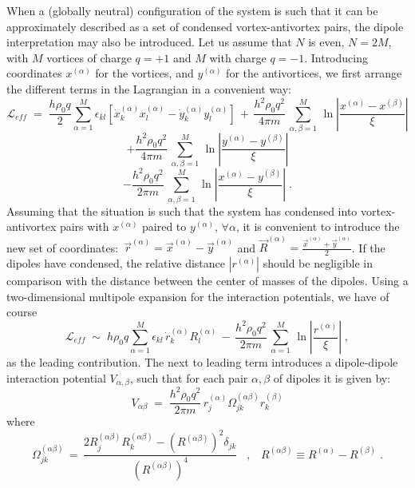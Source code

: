 \documentclass[a4paper,12pt]{article} \tolerance=200
\begin{document}
When a (globally neutral) configuration of the system is such that it
can be approximately described as a set of condensed vortex-antivortex
pairs, the dipole interpretation may also be introduced. Let us assume
that $N$ is even, $N= 2 M$, with $M$ vortices of charge $q=+1$ and $M$
with charge $q=-1$. Introducing coordinates $x^{(\alpha)}$ for the
vortices, and $y^{(\alpha)}$ for the antivortices, we first arrange the
different terms in the Lagrangian in a convenient way:
$$
{\mathcal L}_{eff}\;=\; \frac{h \rho_0 q}{2} \sum_{\alpha = 1}^M \epsilon_{kl} [\dot{x}^{(\alpha)}_k x^{(\alpha)}_l - \dot{y}^{(\alpha)}_k y^{(\alpha)}_l]
\,+\, 
\frac{h^2\rho_0 q^2}{4\pi m}\,\sum_{\alpha,\beta=1}^M \, \ln |\frac{x^{(\alpha)} - x^{(\beta)}}{\xi}| 
$$
$$
+ \frac{h^2\rho_0 q^2}{4\pi m}\,\sum_{\alpha,\beta=1}^M \, \ln |\frac{y^{(\alpha)} - y^{(\beta)}}{\xi}| 
$$
\begin{equation}\label{eq:fq4}
- \frac{h^2\rho_0 q^2}{2\pi m}\,\sum_{\alpha,\beta=1}^M \, \ln |\frac{x^{(\alpha)} - y^{(\beta)}}{\xi}| \;.
\end{equation}
Assuming that the situation is such that the system has condensed into
vortex-antivortex pairs with $x^{(\alpha)}$ paired to $y^{(\alpha)}$, $\forall \alpha$, it
is convenient to introduce the new set of coordinates:~\mbox{${\vec
    r}^{(\alpha)}={\vec x}^{(\alpha)} - {\vec y}^{(\alpha)}$} and {${\vec
    R}^{(\alpha)}=\frac{{\vec x}^{(\alpha)} + {\vec y}^{(\alpha)}}{2}$}. If the
dipoles have condensed, the relative distance $|r^{(\alpha)}|$ should be
negligible in comparison with the distance between the center of
masses of the dipoles. Using a two-dimensional multipole expansion
for the interaction potentials, we have of course
\begin{equation}\label{eq:fq5}
{\mathcal L}_{eff}\;\sim\; h \rho_0 q \sum_{\alpha = 1}^M \epsilon_{kl} \, \dot{r}^{(\alpha)}_k  R^{(\alpha)}_l 
\,-\, \frac{h^2\rho_0 q^2}{2 \pi m}\,\sum_{\alpha=1}^M \, \ln |\frac{r^{(\alpha)}}{\xi}|\;,
\end{equation}
as the leading contribution. The next to leading term introduces a
dipole-dipole interaction potential $V_{\alpha,\beta}$, such that for each pair
$\alpha,\beta$ of dipoles it is given by:
\begin{equation}
V_{\alpha\beta}\;=\; \frac{h^2\rho_0 q^2}{2 \pi m}\, r_j^{(\alpha)} \Omega^{(\alpha\beta)}_{jk} r_k^{(\beta)}
\end{equation}
where
\begin{equation}
\Omega^{(\alpha\beta)}_{jk}\,=\, \frac{2 R^{(\alpha\beta)}_j  R^{(\alpha\beta)}_k - (R^{(\alpha\beta)})^2 \delta_{jk} }{(R^{(\alpha\beta)})^4}\;\;\;,
\;\;\; R^{(\alpha\beta)} \equiv R^{(\alpha)}-R^{(\beta)}\;. 
\end{equation}
\end{document}
